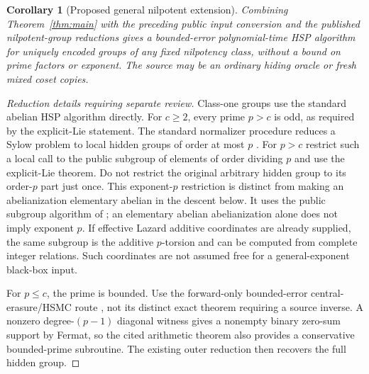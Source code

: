 \documentclass[11pt]{article}
\newtheorem{corollary}[theorem]{Corollary}
\theoremstyle{remark}
\begin{document}
\begin{corollary}[Proposed general nilpotent extension]
Combining Theorem~\ref{thm:main} with the preceding public input conversion
and the published nilpotent-group reductions gives a bounded-error
polynomial-time HSP algorithm for uniquely encoded groups of any fixed
nilpotency class, without a bound on prime factors or exponent. The source
may be an ordinary hiding oracle or fresh mixed coset copies.
\end{corollary}
\begin{proof}[Reduction details requiring separate review]
Class-one groups use the standard abelian HSP algorithm directly. For
$c\ge2$, every prime $p>c$ is odd, as required by the explicit-Lie statement.
The standard normalizer procedure reduces a Sylow problem to local hidden
groups of order at most $p$ \cite[Section 3]{iss}. For $p>c$ restrict such
a local call to the public subgroup of elements of order dividing $p$ and
use the explicit-Lie theorem. Do not restrict the original arbitrary hidden
group to its order-$p$ part just once.
This exponent-$p$ restriction is distinct from making an abelianization
elementary abelian in the descent below. It uses the public subgroup
algorithm of \cite[Lemma 3]{iss}; an elementary abelian abelianization
alone does not imply exponent $p$. If effective Lazard additive coordinates
are already supplied, the same subgroup is the additive $p$-torsion and
can be computed from complete integer relations. Such coordinates are not
assumed free for a general-exponent black-box input.

For $p\le c$, the prime is bounded. Use the forward-only bounded-error
central-erasure/HSMC route \cite[Proposition 3]{ii}, not its distinct exact
theorem requiring a source inverse. A nonzero degree-$(p-1)$ diagonal
witness gives a nonempty binary zero-sum support by Fermat, so the cited
arithmetic theorem also provides a conservative bounded-prime subroutine.
The existing outer reduction then recovers the full hidden group.


\end{proof}
\end{document}
